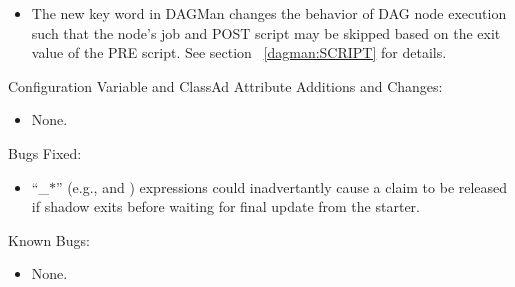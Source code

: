 \begin{itemize}


\item The new  key word in DAGMan changes the
behavior of DAG node execution such that the node's job and POST script
may be skipped based on the exit value of the PRE script.
See section ~\ref{dagman:SCRIPT} for details.


\end{itemize}

\noindent Configuration Variable and ClassAd Attribute Additions and Changes:

\begin{itemize}

\item None.

\end{itemize}

\noindent Bugs Fixed:

\begin{itemize}

\item ``\_$\ast$'' (e.g.,  and 
) expressions could inadvertantly cause a claim to
be released if shadow exits before waiting for final update from the starter. 

\end{itemize}

\noindent Known Bugs:

\begin{itemize}

\item None.

\end{itemize}

